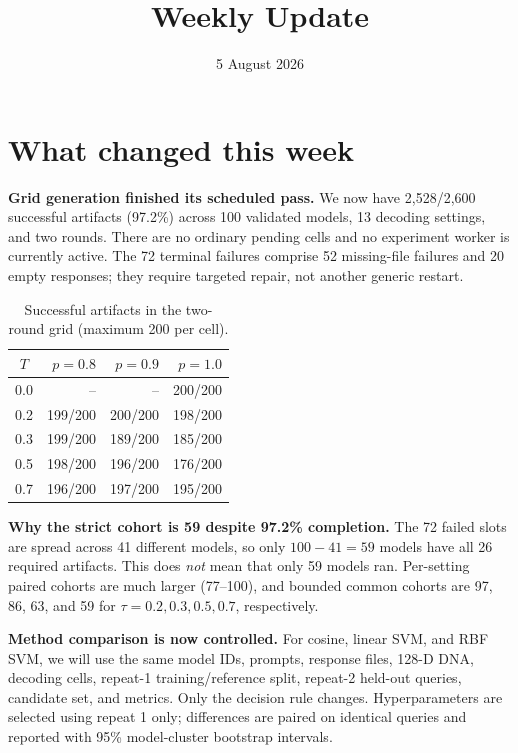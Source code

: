 \documentclass[10pt,a4paper]{article}
\title{Weekly Update}
\author{}
\date{5 August 2026}
\newcommand{\good}[1]{\textcolor{green!45!black}{#1}}
\begin{document}
\maketitle
\vspace{-2.2em}

\section*{What changed this week}

\textbf{Grid generation finished its scheduled pass.} We now have
\good{2,528/2,600 successful artifacts (97.2\%)} across 100 validated models,
13 decoding settings, and two rounds. There are no ordinary pending cells and
no experiment worker is currently active. The 72 terminal failures comprise
52 missing-file failures and 20 empty responses; they require targeted repair,
not another generic restart.

\begin{table}[h]
\centering
\caption{Successful artifacts in the two-round grid (maximum 200 per cell).}
\begin{tabular}{crrr}
\toprule
$T$ & $p=0.8$ & $p=0.9$ & $p=1.0$ \\
\midrule
0.0 & -- & -- & 200/200 \\
0.2 & 199/200 & 200/200 & 198/200 \\
0.3 & 199/200 & 189/200 & 185/200 \\
0.5 & 198/200 & 196/200 & 176/200 \\
0.7 & 196/200 & 197/200 & 195/200 \\
\bottomrule
\end{tabular}
\end{table}

\textbf{Why the strict cohort is 59 despite 97.2\% completion.} The 72 failed
slots are spread across 41 different models, so only $100-41=59$ models have
all 26 required artifacts. This does \emph{not} mean that only 59 models ran.
Per-setting paired cohorts are much larger (77--100), and bounded common
cohorts are 97, 86, 63, and 59 for $\tau=0.2,0.3,0.5,0.7$, respectively.

\textbf{Method comparison is now controlled.} For cosine, linear SVM, and RBF
SVM, we will use the same model IDs, prompts, response files, 128-D DNA,
decoding cells, repeat-1 training/reference split, repeat-2 held-out queries,
candidate set, and metrics. Only the decision rule changes. Hyperparameters are
selected using repeat 1 only; differences are paired on identical queries and
reported with 95\% model-cluster bootstrap intervals.
\end{document}
